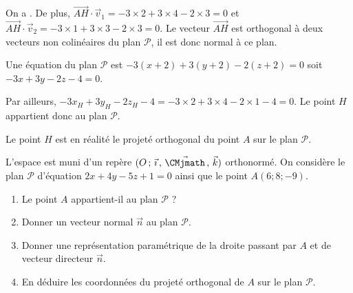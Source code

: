 \documentclass[11pt,fleqn, openany]{book} %
\begin{document}
\begin{solution}On a . De plus, $\overrightarrow{AH}\cdot \vec v_1=-3 \times 2 + 3 \times 4 -2 \times 3 =0$ et $\overrightarrow{AH}\cdot \vec v_2=-3 \times 1 + 3 \times 3 -2 \times 3 =0$. Le vecteur $\overrightarrow{AH}$ est orthogonal à deux vecteurs non colinéaires du plan $\mathcal{P}$, il est donc normal à ce plan.

Une équation du plan $\mathcal{P}$ est $-3(x+2)+3(y+2)-2(z+2)=0$ soit $-3x+3y-2z-4=0$.

Par ailleurs, $-3x_H+3y_H-2z_H-4=-3 \times 2 +3 \times 4 -2 \times 1 -4 = 0$. Le point $H$ appartient donc au plan $\mathcal{P}$.

Le point $H$ est en réalité le projeté orthogonal du point $A$ sur le plan $\mathcal{P}$.\end{solution}



\begin{exercise}[topic=geom15]
L'espace est muni d'un repère $\Oijk$ orthonormé. On considère le plan $\mathcal{P}$ d'équation $2x+4y-5z+1=0$ ainsi que le point $A(6;8;-9)$.

\begin{enumerate}
\item Le point $A$ appartient-il au plan $\mathcal{P}$ ?
\item Donner un vecteur normal $\vec n$ au plan $\mathcal{P}$.
\item Donner une représentation paramétrique de la droite passant par $A$ et de vecteur directeur $\vec n$.
\item En déduire les coordonnées du projeté orthogonal de $A$ sur le plan $\mathcal{P}$.
\end{enumerate}\end{exercise}
\end{document}
